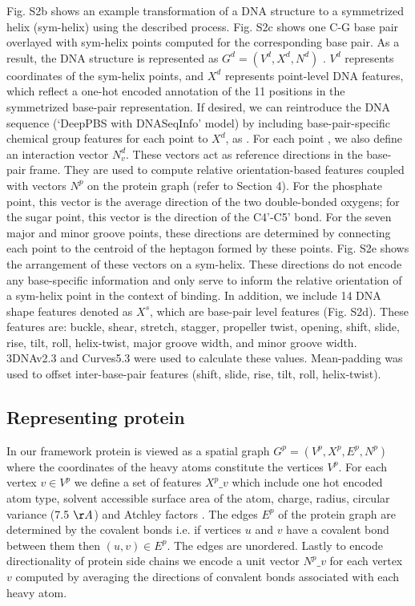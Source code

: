 Fig. S2b shows an example transformation of a DNA structure to a symmetrized helix (sym-helix) using the described process. Fig. S2c shows one C-G base pair overlayed with sym-helix points computed for the corresponding base pair. As a result, the DNA structure is represented as $G^d = (V^d, X^d, N^d)$ .  $V^d$ represents coordinates of the sym-helix points, and $X^d$ represents point-level DNA features, which reflect a one-hot encoded annotation of the 11 positions in the symmetrized base-pair representation. If desired, we can reintroduce the DNA sequence (`DeepPBS with DNASeqInfo' model) by including base-pair-specific chemical group features for each point to $X^d$, as \citep{Chiu2023}. For each point , we also define an interaction vector $N^d_v$. These vectors act as reference directions in the base-pair frame. They are used to compute relative orientation-based features coupled with vectors $N^p$ on the protein graph (refer to Section 4). For the phosphate point, this vector is the average direction of the two double-bonded oxygens; for the sugar point, this vector is the direction of the C4'-C5' bond. For the seven major and minor groove points, these directions are determined by connecting each point to the centroid of the heptagon formed by these points. Fig. S2e shows the arrangement of these vectors on a sym-helix. These directions do not encode any base-specific information and only serve to inform the relative orientation of a sym-helix point in the context of binding. In addition, we include 14 DNA shape features \citep{Lavery2009, Lu2008, lavery1989defining} denoted as $X^s$, which are base-pair level features (Fig. S2d). These features are: buckle, shear, stretch, stagger, propeller twist, opening, shift, slide, rise, tilt, roll, helix-twist, major groove width, and minor groove width. 3DNAv2.3 \citep{Lu2008} and Curves5.3 \citep{Lavery2009, lavery1989defining} were used to calculate these values. Mean-padding was used to offset inter-base-pair features (shift, slide, rise, tilt, roll, helix-twist).

\subsection{Representing protein}

In our framework protein is viewed as a spatial graph $G^p = (V^p, X^p, E^p, N^p)$  where the
coordinates of the heavy atoms constitute the vertices $V^p$. For each vertex $v \in V^p$  we define
a set of features $X^p\_v$ which include one hot encoded atom type, solvent accessible surface area
of the atom, charge, radius, circular variance (7.5 $\AA$) and Atchley factors \citep{Atchley2005}. The edges $E^p$ of the protein
graph  are determined by the covalent bonds i.e. if  vertices $u$ and $v$ have
a covalent bond between them then $(u,v) \in E^p$. The edges are unordered. Lastly to encode
directionality of protein side chains we encode a unit vector $N^p\_v$ for each vertex $v$ computed by
averaging the directions of convalent bonds associated with each heavy atom. 

